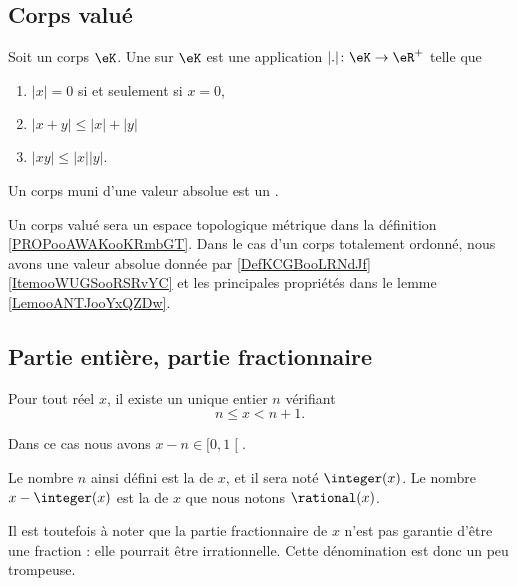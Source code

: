 \subsection{Corps valué}

\begin{definition}       \label{DEFooBWXXooAkBBRS}
	Soit un corps \( \eK\). Une  sur \(\eK\) est une application \( | . |\colon \eK\to \eR^+\) telle que
	\begin{enumerate}
		\item
		      \( | x |=0\) si et seulement si \( x=0\),
		\item
		      \( | x+y |\leq | x |+| y |\)
		\item
		      \( | xy |\leq | x | | y |\).
	\end{enumerate}
	Un corps muni d'une valeur absolue est un .
\end{definition}
Un corps valué sera un espace topologique métrique dans la définition \ref{PROPooAWAKooKRmbGT}. Dans le cas d'un corps totalement ordonné, nous avons une valeur absolue donnée par \ref{DefKCGBooLRNdJf}\ref{ItemooWUGSooRSRvYC} et les principales propriétés dans le lemme \ref{LemooANTJooYxQZDw}.

\subsection{Partie entière, partie fractionnaire}

\begin{lemmaDef}      \label{LEMooLEXTooGAQxGB}
	Pour tout réel \( x\), il existe un unique entier \( n\) vérifiant
	\begin{equation}
		n\leq x<n+1.
	\end{equation}

	Dans ce cas nous avons \( x-n\in\mathopen[ 0 , 1 \mathclose[\).

	Le nombre \( n\) ainsi défini est la  de \( x\), et il sera noté \( \integer(x)\). Le nombre \( x-\integer(x)\) est la  de \( x\) que nous notons \( \rational(x)\).

	Il est toutefois à noter que la partie fractionnaire de \( x\) n'est pas garantie d'être une fraction : elle pourrait être irrationnelle. Cette dénomination est donc un peu trompeuse.
\end{lemmaDef}

